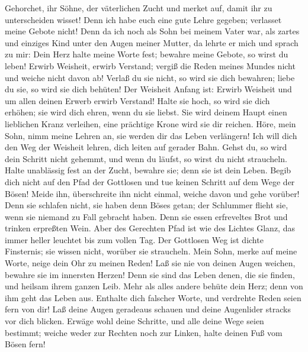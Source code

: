  Gehorchet, ihr Söhne, der väterlichen Zucht und merket
auf, damit ihr zu unterscheiden wisset!  Denn ich habe
euch eine gute Lehre gegeben; verlasset meine Gebote nicht!
 Denn da ich noch als Sohn bei meinem Vater war, als
zartes und einziges Kind unter den Augen meiner Mutter, 
da lehrte er mich und sprach zu mir: Dein Herz halte meine Worte fest;
bewahre meine Gebote, so wirst du leben!  Erwirb Weisheit,
erwirb Verstand; vergiß die Reden meines Mundes nicht und weiche nicht
davon ab!  Verlaß du sie nicht, so wird sie dich bewahren;
liebe du sie, so wird sie dich behüten!  Der Weisheit
Anfang ist: Erwirb Weisheit und um allen deinen Erwerb erwirb Verstand!
 Halte sie hoch, so wird sie dich erhöhen; sie wird dich
ehren, wenn du sie liebst.  Sie wird deinem Haupt einen
lieblichen Kranz verleihen, eine prächtige Krone wird sie dir reichen.
 Höre, mein Sohn, nimm meine Lehren an, sie werden dir
das Leben verlängern!  Ich will dich den Weg der Weisheit
lehren, dich leiten auf gerader Bahn.  Gehst du, so wird
dein Schritt nicht gehemmt, und wenn du läufst, so wirst du nicht
straucheln.  Halte unablässig fest an der Zucht, bewahre
sie; denn sie ist dein Leben.  Begib dich nicht auf den
Pfad der Gottlosen und tue keinen Schritt auf dem Wege der Bösen!
 Meide ihn, überschreite ihn nicht einmal, weiche davon
und gehe vorüber!  Denn sie schlafen nicht, sie haben
denn Böses getan; der Schlummer flieht sie, wenn sie niemand zu Fall
gebracht haben.  Denn sie essen erfreveltes Brot und
trinken erpreßten Wein.  Aber des Gerechten Pfad ist wie
des Lichtes Glanz, das immer heller leuchtet bis zum vollen Tag.
 Der Gottlosen Weg ist dichte Finsternis; sie wissen
nicht, worüber sie straucheln.  Mein Sohn, merke auf
meine Worte, neige dein Ohr zu meinen Reden!  Laß sie nie
von deinen Augen weichen, bewahre sie im innersten Herzen!
 Denn sie sind das Leben denen, die sie finden, und
heilsam ihrem ganzen Leib.  Mehr als alles andere behüte
dein Herz; denn von ihm geht das Leben aus.  Enthalte
dich falscher Worte, und verdrehte Reden seien fern von dir!
 Laß deine Augen geradeaus schauen und deine Augenlider
stracks vor dich blicken.  Erwäge wohl deine Schritte,
und alle deine Wege seien bestimmt;  weiche weder zur
Rechten noch zur Linken, halte deinen Fuß vom Bösen fern!

